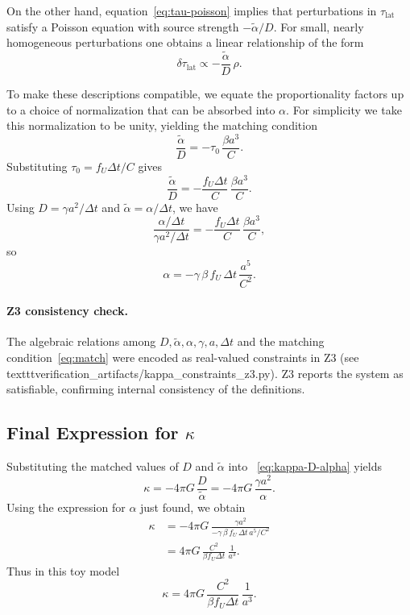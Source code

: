 On the other hand, equation~\eqref{eq:tau-poisson} implies that perturbations
in $\tau_{\mathrm{lat}}$ satisfy a Poisson equation with source strength
$-\tilde{\alpha}/D$. For small, nearly homogeneous perturbations one obtains a
linear relationship of the form
\begin{equation}
\delta \tau_{\mathrm{lat}} \propto -\frac{\tilde{\alpha}}{D} \, \rho.
\end{equation}

To make these descriptions compatible, we equate the proportionality factors
up to a choice of normalization that can be absorbed into $\alpha$. For
simplicity we take this normalization to be unity, yielding the matching
condition
\begin{equation}
\frac{\tilde{\alpha}}{D} = -\tau_0 \, \frac{\beta a^3}{C}.
\label{eq:match}
\end{equation}
Substituting $\tau_0 = f_U \Delta t / C$ gives
\begin{equation}
\frac{\tilde{\alpha}}{D} = -\frac{f_U \Delta t}{C} \, \frac{\beta a^3}{C}.
\end{equation}
Using $D = \gamma a^2 / \Delta t$ and $\tilde{\alpha} = \alpha / \Delta t$,
we have
\begin{equation}
\frac{\alpha / \Delta t}{\gamma a^2 / \Delta t}
  = -\frac{f_U \Delta t}{C} \, \frac{\beta a^3}{C},
\end{equation}
so
\begin{equation}
\alpha = -\gamma \, \beta \, f_U \, \Delta t \, \frac{a^5}{C^2}.
\end{equation}

\paragraph{Z3 consistency check.}
The algebraic relations among $D, \tilde{\alpha}, \alpha, \gamma, a, \Delta t$
and the matching condition~\eqref{eq:match} were encoded as real-valued
constraints in Z3 (see
\\texttt{verification\_artifacts/kappa\_constraints\_z3.py}). Z3 reports the
system as satisfiable, confirming internal consistency of the definitions.

\subsection{Final Expression for $\kappa$}
Substituting the matched values of $D$ and $\tilde{\alpha}$ into
~\eqref{eq:kappa-D-alpha} yields
\begin{equation}
\kappa = -4\pi G \, \frac{D}{\tilde{\alpha}} = -4\pi G \, \frac{\gamma a^2}{\alpha}.
\end{equation}
Using the expression for $\alpha$ just found, we obtain
\begin{align}
\kappa &= -4\pi G \, \frac{\gamma a^2}{-\gamma \, \beta \, f_U \, \Delta t \, a^5 / C^2} \\
       &= 4\pi G \, \frac{C^2}{\beta f_U \Delta t} \, \frac{1}{a^3}.
\end{align}
Thus in this toy model
\begin{equation}
\boxed{\kappa
  = 4\pi G \, \frac{C^2}{\beta f_U \Delta t} \, \frac{1}{a^3}.}
\end{equation}

